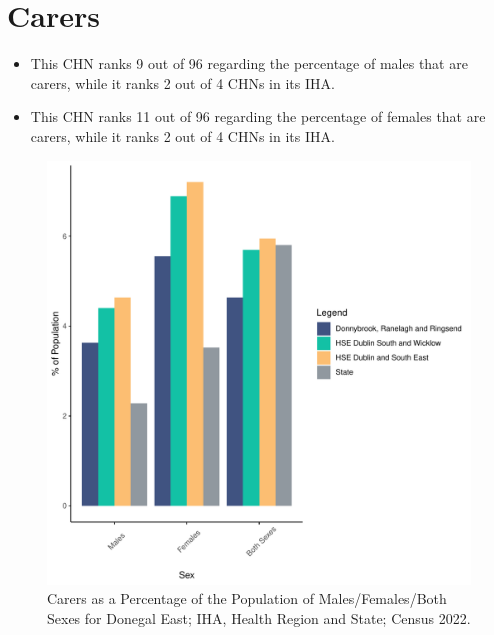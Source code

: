 \documentclass{article}
\begin{document}
\section{Carers}\label{sect:Carers}
\begin{itemize}
\item This CHN ranks  9 out of 96 regarding the percentage of males that are carers, while it ranks   2 out of 4 CHNs in its IHA.
\item This CHN ranks  11 out of 96 regarding the percentage of females that are carers, while it ranks   2 out of 4 CHNs in its IHA.
\end{itemize}
\begin{figure}[H]
	\centering
	\includegraphics[width = 150mm]{../figures/CareED.pdf}
	\caption{Carers as a Percentage of the Population of Males/Females/Both Sexes for Donegal East; IHA, Health Region and State; Census 2022.}
	\label{fig:2ae19629-1a6a-13a3-e055-000000000001}
	\end{figure}
\end{document}
